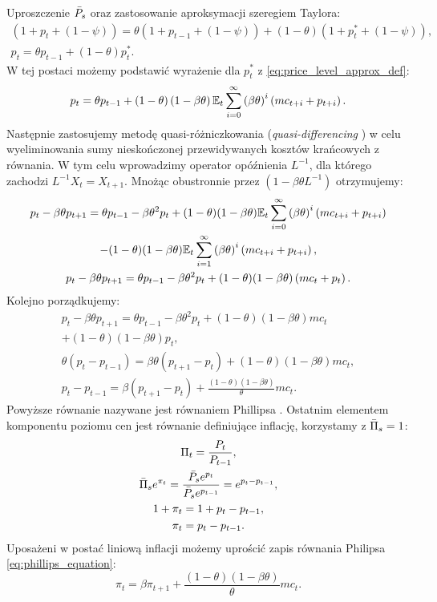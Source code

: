 Uproszczenie $\bar{P}_s$ oraz zastosowanie aproksymacji szeregiem Taylora:
\begin{gather}
    \left(1 + p_t + (1- \psi)\right) = \theta\left(1 + p_{t-1} + (1-\psi)\right) + (1-\theta)\left(1 + p_t^* + (1-\psi)\right),\\
    p_t = \theta p_{t-1} + (1 - \theta)p_t^*.
\end{gather}
W tej postaci możemy podstawić wyrażenie dla $p_t^*$ z \eqref{eq:price_level_approx_def}:
\begin{equation}
    p_t = \theta p_{t-1} + (1 - \theta) \left( 1 - \beta \theta \right) \mathbb{E}_t \sum_{i=0}^{\infty} \left( \beta \theta \right)^i \left(  mc_{t+i} + p_{t+i} \right).
\end{equation}
Następnie zastosujemy metodę quasi-różniczkowania (\emph{quasi-differencing} \cite{costaBook}) w celu wyeliminowania sumy nieskończonej przewidywanych kosztów krańcowych z równania. W tym celu wprowadzimy operator opóźnienia $L^{-1}$, dla którego zachodzi $L^{-1} X_t = X_{t+1}$. Mnożąc obustronnie przez $(1-\beta\theta L^{-1})$ otrzymujemy:
\begin{gather}
    \nonumber p_t - \beta\theta p_{t+1} = \theta p_{t-1} - \beta \theta^2 p_t + (1 - \theta)(1 - \beta \theta) \mathbb{E}_t \sum_{i=0}^{\infty} \left( \beta \theta \right)^i \left(  mc_{t+i} + p_{t+i} \right)\\ - (1 - \theta)(1 - \beta \theta) \mathbb{E}_t \sum_{i=1}^{\infty} \left( \beta \theta \right)^i \left(  mc_{t+i} + p_{t+i} \right), \\
    p_t - \beta\theta p_{t+1} = \theta p_{t-1} - \beta \theta^2 p_t + (1 - \theta)(1 - \beta \theta) \left(mc_t + p_t \right).
\end{gather}
Kolejno porządkujemy:
\begin{gather}
    \nonumber p_t - \beta\theta p_{t+1} = \theta p_{t-1} - \beta \theta^2 p_t + (1 - \theta)(1 - \beta \theta) mc_t \\ + (1 - \theta)(1 - \beta \theta) p_t, \\
    \theta(p_t - p_{t-1}) = \beta \theta (p_{t+1} - p_t) + (1-\theta)(1-\beta \theta)mc_t, \\
    \label{eq:phillips_equation}
    p_t - p_{t-1} = \beta (p_{t+1} - p_t) + \frac{(1-\theta)(1-\beta \theta)}{\theta}mc_t.
\end{gather}
Powyższe równanie nazywane jest równaniem Phillipsa \cite{costaBook}. Ostatnim elementem komponentu poziomu cen jest równanie definiujące inflację, korzystamy z $\bar{\Pi}_s = 1$:
\begin{gather}
    \Pi_t = \frac{P_t}{P_{t-1}}, \\
    \bar{\Pi}_s e^{\pi_t} = \frac{\bar{P}_se^{p_t}}{\bar{P}_se^{p_{t-1}}} = e^{p_t - p_{t-1}},\\ 
    1 + \pi_t = 1 + p_t - p_{t-1}, \\
    \pi_t = p_t - p_{t-1}.
\end{gather}
Uposażeni w postać liniową inflacji możemy uprościć zapis równania Philipsa \eqref{eq:phillips_equation}:
\begin{equation}
    \pi_t = \beta \pi_{t+1} + \frac{(1-\theta)(1-\beta \theta)}{\theta}mc_t.
\end{equation}

